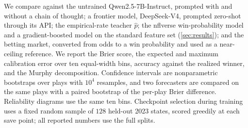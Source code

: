 We compare against the untrained Qwen2.5-7B-Instruct, prompted with and without a chain of thought; a
frontier model, DeepSeek-V4, prompted zero-shot through its API; the empirical-rate teacher $\hat p$; the
nflverse win-probability model and a gradient-boosted model on the standard feature set
(\cref{sec:results}); and the betting market, converted from odds to a win probability
\citep{strumbelj2014} and used as a near-ceiling reference. We report the Brier score, the expected and
maximum calibration error over ten equal-width bins, accuracy against the realized winner, and the Murphy
decomposition. Confidence intervals are nonparametric bootstraps over plays with $10^4$ resamples, and
two forecasters are compared on the same plays with a paired bootstrap of the per-play Brier difference.
Reliability diagrams use the same ten bins. Checkpoint selection during training uses a fixed random
sample of $128$ held-out 2023 states, scored greedily at each save point; all reported numbers use the
full splits.
